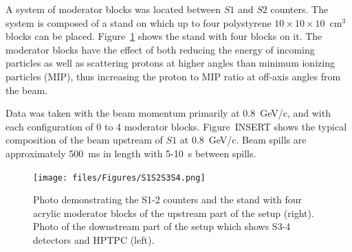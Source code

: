     
    A system of moderator blocks was located between $S1$ and $S2$ counters.  The system is composed of a stand on which up to four polystyrene $10\times10\times10$~cm$^3$ blocks can be placed. Figure~\ref{fig:modblocks} shows the stand with four blocks on it. The moderator blocks have the effect of both reducing the energy of incoming particles as well as scattering protons at higher angles than minimum ionizing particles (MIP), thus increasing the proton to MIP ratio at off-axis angles from the beam. 
    
    Data was taken with the beam momentum primarily at 0.8~GeV/c, and with each configuration of 0 to 4 moderator blocks. Figure~INSERT shows the typical composition of the beam upstream of $S1$ at 0.8~GeV/c. Beam spills are approximately 500~ms in length with 5-10~s between spills.  
    
    
    
    \begin{figure}[t]
      \centering
    \texttt{[image: files/Figures/S1S2S3S4.png]}
    	\caption{Photo demonstrating the S1-2 counters and the stand with four acrylic moderator blocks of the upstream part of the setup (right). Photo of the downstream part of the setup which shows S3-4 detectors and HPTPC (left).}
    		\label{fig:modblocks}
    \end{figure}
    
